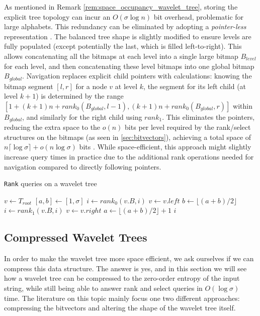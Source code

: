 \noindent As mentioned in Remark \ref{rem:space_occupancy_wavelet_tree}, storing the explicit tree topology can incur an $O(\sigma \log n)$ bit overhead, problematic for large alphabets. This redundancy can be eliminated by adopting a \emph{pointer-less} representation \cite{WTForALL}. The balanced tree shape is slightly modified to ensure levels are fully populated (except potentially the last, which is filled left-to-right). This allows concatenating all the bitmaps at each level into a single large bitmap $B_{level}$ for each level, and then concatenating these level bitmaps into one global bitmap $B_{global}$. Navigation replaces explicit child pointers with calculations: knowing the bitmap segment $[l, r]$ for a node $v$ at level $k$, the segment for its left child (at level $k+1$) is determined by the range $[1 + (k+1)n + rank_0(B_{global}, l-1), (k+1)n + rank_0(B_{global}, r)]$ within $B_{global}$, and similarly for the right child using $rank_1$. This eliminates the pointers, reducing the extra space to the $o(n)$ bits per level required by the rank/select structures on the bitmaps (as seen in \ref{sec:bitvectors}), achieving a total space of $n \lceil \log \sigma \rceil + o(n \log \sigma)$ bits \cite{MAKINEN2007332,MAKINEN2006703}. While space-efficient, this approach might slightly increase query times in practice due to the additional rank operations needed for navigation compared to directly following pointers.

\begin{algorithm}[h!]
    \caption{\texttt{Rank} queries on a wavelet tree}\label{alg:rank_wt}
    \begin{algorithmic}
        \State $v \gets T_{root}$ 
        \State $[a,b] \gets [1,\sigma]$
        \State $i \gets rank_0(v.B,i)$
        \State $v \gets v.left$ 
        \State $b \gets \lfloor (a+b)/2 \rfloor$
        \Else
        \State $i \gets rank_1(v.B,i)$
        \State $v \gets v.right$ 
        \State $a \gets \lfloor (a+b)/2 \rfloor +1$
        \EndIf
        \EndWhile
        \State \Return $i$
        \EndFunction
    \end{algorithmic}

\end{algorithm}

\subsection{Compressed Wavelet Trees} \label{sec:compressed_WT}
In order to make the wavelet tree more space efficient, we ask ourselves if we can compress this data structure. The answer is yes, and in this section we will see how a wavelet tree can be compressed to the zero-order entropy of the input string, while still being able to answer rank and select queries in $O(\log \sigma)$ time. The literature on this topic mainly focus one two different approaches: compressing the bitvectors and altering the shape of the wavelet tree itself.

